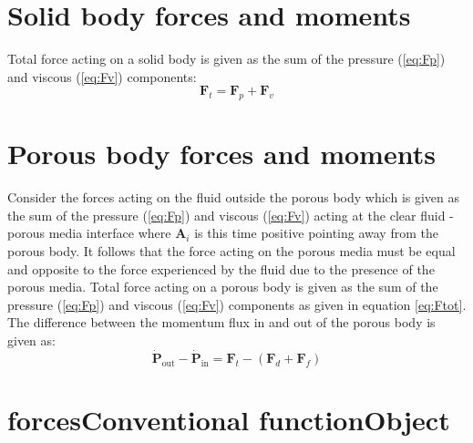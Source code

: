 \documentclass[a4paper,11pt]{report}
\begin{document}
\section{Solid body forces and moments}

Total force acting on a solid body is given as the sum of the pressure (\ref{eq:Fp}) and viscous (\ref{eq:Fv}) components:
\begin{equation}
    \mathbf{F}_{t} = \mathbf{F}_{p} + \mathbf{F}_{v}
    \label{eq:Ftot}
\end{equation}

\section{Porous body forces and moments}

Consider the forces acting on the fluid outside the porous body which is given as the sum of the pressure (\ref{eq:Fp}) and viscous (\ref{eq:Fv}) acting at the clear fluid - porous media interface where $\mathbf{A}_i$ is this time positive pointing away from the porous body. It follows that the force acting on the porous media must be equal and opposite to the force experienced by the fluid due to the presence of the porous media. Total force acting on a porous body is given as the sum of the pressure (\ref{eq:Fp}) and viscous (\ref{eq:Fv}) components as given in equation \ref{eq:Ftot}.
\vspace{5mm}\\
The difference between the momentum flux in and out of the porous body is given as:
\begin{equation}
    \mathbf{\dot{P}}_\mathrm{out} - \mathbf{\dot{P}}_\mathrm{in} = \mathbf{F}_{t} - (\mathbf{F}_{d} + \mathbf{F}_{f})
    \label{eq:flux}
\end{equation}

\section{forcesConventional functionObject}
\label{sec:forcesConventional}
\end{document}
